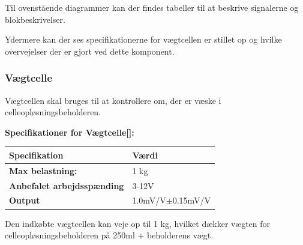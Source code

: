 Til ovenstående diagrammer kan der findes tabeller til at beskrive signalerne og blokbeskrivelser. 

Ydermere kan der ses specifikationerne for vægtcellen er stillet op og hvilke overvejelser der er gjort ved dette komponent.
\subsubsection{Vægtcelle}
\label{subsec:loadcell}
Vægtcellen skal bruges til at kontrollere om, der er væske i celleopløsningsbeholderen.

\textbf{Specifikationer for Vægtcelle[\citet{DH7}]:} 
\begin{center}
		\begin{longtable}{ | m{6.5cm} | m{6.5cm}| } 
			\hline
			\textbf{Specifikation} &\textbf{Værdi} \\ 
			\hline
			\textbf{Max belastning:} & 1 kg \\ 
			\hline
			\textbf{Anbefalet arbejdsspænding} & 3-12V \\ 
			\hline
			\textbf{Output} & 1.0mV/V$\pm$0.15mV/V \\ 
			\hline
		\end{longtable}
\end{center}

Den indkøbte vægtcellen kan veje op til 1 kg, hvilket dækker vægten for celleopløsningsbeholderen på 250ml + beholderens vægt.

